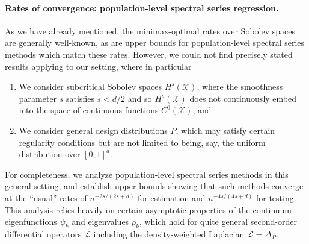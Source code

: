 \documentclass{article}
\theoremstyle{definition}
\newcommand{\mc}[1]{\mathcal{#1}}
\newcommand{\1}{\mathbf{1}}
\begin{document}
	\paragraph{Rates of convergence: population-level spectral series regression.}
	As we have already mentioned, the minimax-optimal rates over Sobolev spaces are generally well-known, as are upper bounds for population-level spectral series methods which match these rates. However, we could not find precisely stated results applying to our setting, where in particular
	\begin{enumerate}
		\item We consider subcritical Sobolev spaces $H^s(\mc{X})$, where the smoothness parameter $s$ satisfies $s < d/2$ and so $H^s(\mc{X})$ does not continuously embed into the space of continuous functions $C^0(\mc{X})$, and 
		\item We consider general design distributions $P$, which may satisfy certain regularity conditions but are not limited to being, say, the uniform distribution over $[0,1]^d$. 
	\end{enumerate}
	For completeness, we analyze population-level spectral series methods in this general setting, and establish upper bounds showing that such methods converge at the ``usual'' rates of $n^{-2s/(2s + d)}$ for estimation and $n^{-4s/(4s + d)}$ for testing. This analysis relies heavily on certain asymptotic properties of the continuum eigenfunctions $\psi_k$ and eigenvalues $\rho_k$, which hold for quite general second-order differential operators $\mc{L}$ including the density-weighted Laplacian $\mc{L} = \Delta_P$.
	 
\end{document}
